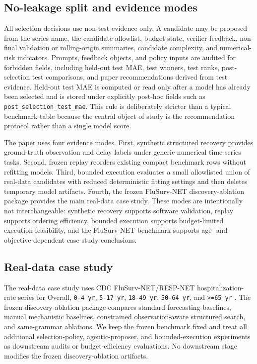\subsection{No-leakage split and evidence modes}

All selection decisions use non-test evidence only. A candidate may be proposed
from the series name, the candidate allowlist, budget state, verifier feedback,
non-final validation or rolling-origin summaries, candidate complexity, and
numerical-risk indicators. Prompts, feedback objects, and policy inputs are
audited for forbidden fields, including held-out test MAE, test winners, test
ranks, post-selection test comparisons, and paper recommendations derived from
test evidence. Held-out test MAE is computed or read only after a model has
already been selected and is stored under explicitly post-hoc fields such as
\texttt{post\_selection\_test\_mae}. This rule is deliberately stricter than a
typical benchmark table because the central object of study is the
recommendation protocol rather than a single model score.

The paper uses four evidence modes. First, synthetic structured recovery
provides ground-truth observation and delay labels under generic numerical
time-series tasks. Second, frozen replay reorders existing compact benchmark
rows without refitting models. Third, bounded execution evaluates a small
allowlisted union of real-data candidates with reduced deterministic fitting
settings and then deletes temporary model artifacts. Fourth, the frozen
FluSurv-NET discovery-ablation package provides the main real-data case study.
These modes are intentionally not interchangeable: synthetic recovery supports
software validation, replay supports ordering efficiency, bounded execution
supports budget-limited execution feasibility, and the FluSurv-NET benchmark
supports age- and objective-dependent case-study conclusions.

\subsection{Real-data case study}

The real-data case study uses CDC FluSurv-NET/RESP-NET hospitalization-rate
series for Overall, \texttt{0-4 yr}, \texttt{5-17 yr}, \texttt{18-49 yr},
\texttt{50-64 yr}, and \texttt{>=65 yr}
\citep{cdcFluSurvNet2026,cdcRespNet2026,naquin2024flusurvnet}. The frozen
discovery-ablation package compares standard forecasting baselines, manual
mechanistic baselines, constrained observation-aware structured search, and
same-grammar ablations. We keep the frozen benchmark fixed and treat all
additional selection-policy, agentic-proposer, and bounded-execution experiments
as downstream audits or budget-efficiency evaluations. No downstream stage
modifies the frozen discovery-ablation artifacts.

